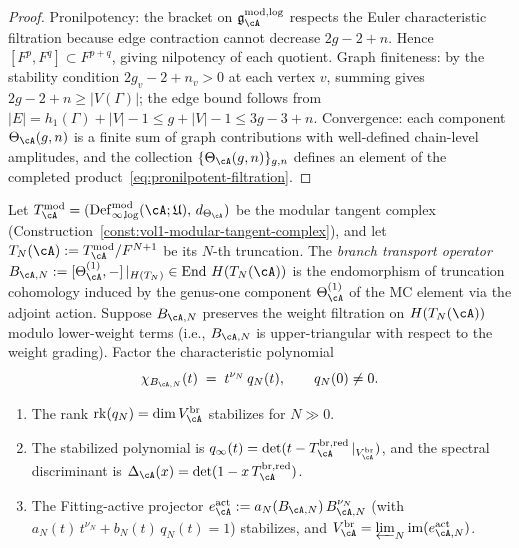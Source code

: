 \begin{proof}
Pronilpotency: the bracket on
$\mathfrak{g}^{\mathrm{mod,log}}_\cA$ respects the Euler
characteristic filtration because edge contraction cannot decrease
$2g-2+n$.  Hence $[F^p, F^q] \subset F^{p+q}$, giving nilpotency
of each quotient.  Graph finiteness: by the stability condition
$2g_v - 2 + n_v > 0$ at each vertex $v$, summing gives
$2g - 2 + n \geq |V(\Gamma)|$; the edge bound follows from
$|E| = h_1(\Gamma) + |V| - 1 \leq g + |V| - 1 \leq 3g - 3 + n$.
Convergence: each component
$\Theta_\cA(g,n)$ is a finite sum of graph contributions with
well-defined chain-level amplitudes, and the collection
$\{\Theta_\cA(g,n)\}_{g,n}$ defines an element of the completed
product~\eqref{eq:pronilpotent-filtration}.
\end{proof}

\begin{theorem}
\label{thm:finite-rank-spectral-reduction}
Let $T_\cA^{\mathrm{mod}}
= (\operatorname{Def}_{\infty,\!\log}^{\mathrm{mod}}(\cA;\mathfrak{U}),\, d_{\Theta_\cA})$
be the modular tangent complex
\textup{(}Construction~\textup{\ref{const:vol1-modular-tangent-complex})},
and let
$T_N(\cA) := T_\cA^{\mathrm{mod}} / F^{N+1}$
be its $N$-th truncation.
The \emph{branch transport operator}
$B_{\cA,N} := [\Theta_\cA^{(1)}, -]\,|_{H(T_N)}
\in \operatorname{End}\, H(T_N(\cA))$
is the endomorphism of truncation cohomology induced by the
genus-one component $\Theta_\cA^{(1)}$ of the MC element via
the adjoint action.
Suppose $B_{\cA,N}$ preserves the weight filtration on
$H(T_N(\cA))$ modulo lower-weight terms
\textup{(}i.e., $B_{\cA,N}$ is upper-triangular with respect to
the weight grading\textup{)}.
Factor the characteristic
polynomial
\begin{equation}
\label{eq:fitting-factorization}
\chi_{B_{\cA,N}}(t) \;=\; t^{\nu_N}\, q_N(t),
\qquad q_N(0) \neq 0.
\end{equation}
\begin{enumerate}[label=\textup{(\roman*)}]
\item The rank $\operatorname{rk}(q_N) = \dim V_\cA^{\mathrm{br}}$
  stabilizes for $N \gg 0$.
\item The stabilized polynomial is
  $q_\infty(t) = \det(t - T_\cA^{\mathrm{br,red}}\,|_{V_\cA^{\mathrm{br}}})$,
  and the spectral discriminant is
  $\Delta_\cA(x) = \det(1 - x\, T_\cA^{\mathrm{br,red}})$.
\item The Fitting-active projector
  $e_{\cA}^{\mathrm{act}} := a_N(B_{\cA,N})\, B_{\cA,N}^{\nu_N}$
  \textup{(}with $a_N(t)\,t^{\nu_N} + b_N(t)\,q_N(t) = 1$\textup{)}
  stabilizes, and $V_\cA^{\mathrm{br}}
  = \varprojlim_N \operatorname{im}(e_{\cA,N}^{\mathrm{act}})$.
\end{enumerate}
\end{theorem}

